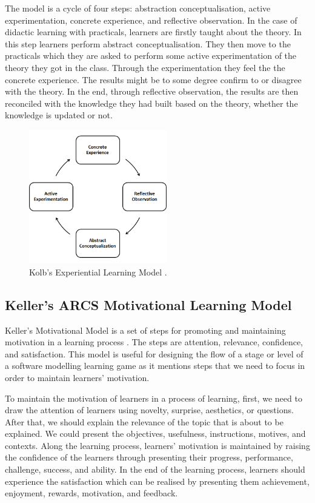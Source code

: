 \documentclass[12pt, a4paper]{report}
\begin{document}
The model is a cycle of four steps: abstraction conceptualisation, active experimentation, concrete experience, and reflective observation. In the case of didactic learning with practicals, learners are firstly taught about the theory. In this step learners perform abstract conceptualisation. They then move to the practicals which they are asked to perform some active experimentation of the theory they got in the class. Through the experimentation they feel the the concrete experience. The results might be to some degree confirm to or disagree with the theory. In the end, through reflective observation, the results are then reconciled with the knowledge they had built based on the theory, whether the knowledge is updated or not.   

\begin{figure}[ht]
\centering
\includegraphics[width=6cm]{kolb}
\caption{Kolb’s Experiential Learning Model \cite{kolb2014experiential}.}
\label{fig:kolb}
\end{figure}

\subsection{Keller’s ARCS Motivational Learning Model}
Keller's Motivational Model is a set of steps for promoting and maintaining motivation in a learning process \cite{keller2010motivational}. The steps are attention, relevance, confidence, and satisfaction. This model is useful for  designing the flow of a stage or level of a software modelling learning game as it mentions steps that we need to focus in order to maintain learners' motivation.

To maintain the motivation of learners in a process of learning, first, we need to draw the attention of learners using novelty, surprise, aesthetics, or questions. After that, we should explain the relevance of the topic that is about to be explained. We could present the objectives, usefulness, instructions, motives, and contexts. Along the learning process, learners' motivation is maintained by raising the confidence of the learners through presenting their progress, performance, challenge, success, and ability. In the end of the learning process, learners should experience the satisfaction which can be realised by presenting them achievement, enjoyment, rewards, motivation, and feedback.
    
\end{document}
